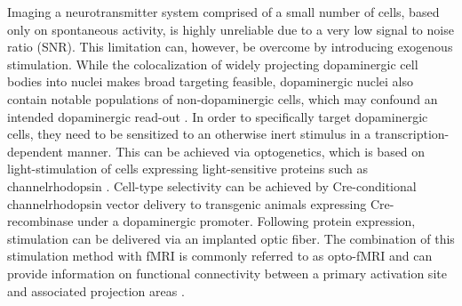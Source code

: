 Imaging a neurotransmitter system comprised of a small number of cells, based only on spontaneous activity, is highly unreliable due to a very low signal to noise ratio (SNR).
This limitation can, however, be overcome by introducing exogenous stimulation.
While the colocalization of widely projecting dopaminergic cell bodies into nuclei makes broad targeting feasible, dopaminergic nuclei also contain notable populations of non-dopaminergic cells, which may confound an intended dopaminergic read-out \cite{Taylor2014}.
In order to specifically target dopaminergic cells, they need to be sensitized to an otherwise inert stimulus in a transcription-dependent manner.
This can be achieved via optogenetics, which is based on light-stimulation of cells expressing light-sensitive proteins such as channelrhodopsin \cite{Boyden2005}.
Cell-type selectivity can be achieved by Cre-conditional channelrhodopsin vector delivery \cite{Orban1992} to transgenic animals expressing Cre-recombinase under a dopaminergic promoter.
Following protein expression, stimulation can be delivered via an implanted optic fiber.
The combination of this stimulation method with fMRI is commonly referred to as opto-fMRI and can provide information on functional connectivity between a primary activation site and associated projection areas \cite{Desai2011,Grandjean2019}.



